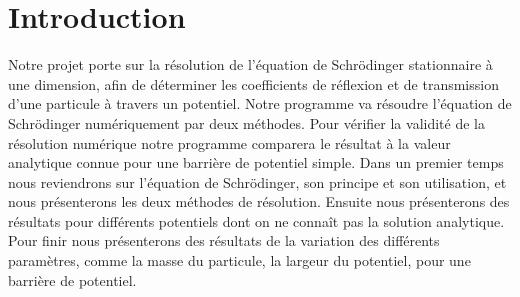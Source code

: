 \section*{Introduction}

\par Notre projet porte sur la résolution de l’équation  de Schrödinger stationnaire à une dimension, afin de déterminer les coefficients de réflexion et de transmission d’une particule à travers  un potentiel. Notre programme va résoudre l’équation de Schrödinger numériquement par deux méthodes. Pour vérifier la validité de la résolution numérique notre programme comparera le résultat à la valeur analytique connue pour une barrière de potentiel simple. Dans un premier temps nous reviendrons sur l’équation de Schrödinger, son principe et son utilisation, et nous présenterons les deux méthodes de résolution. Ensuite nous présenterons des résultats pour différents potentiels dont on ne connaît pas la solution analytique. Pour finir nous présenterons des résultats de la variation des différents paramètres, comme la masse du particule, la largeur du potentiel, pour une barrière de potentiel.

